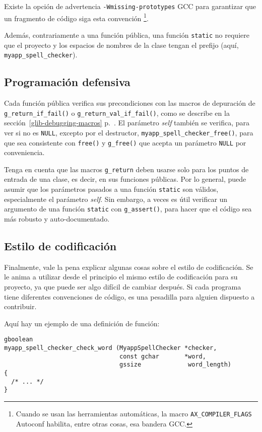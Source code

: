 Existe la opción de advertencia \texttt{-Wmissing-prototypes} GCC para garantizar que un fragmento de código siga esta convención \footnote{Cuando se usan las herramientas automáticas, la macro \texttt{AX\_COMPILER\_FLAGS} Autoconf habilita, entre otras cosas, esa bandera GCC.}.

Además, contrariamente a una función pública, una función \lstinline{static} no requiere que el proyecto y los espacios de nombres de la clase tengan el prefijo (aquí, \lstinline{myapp_spell_checker}).

\subsection{Programación defensiva}
Cada función pública verifica sus precondiciones con las macros de depuración de \lstinline{g_return_if_fail()} o \lstinline{g_return_val_if_fail()}, como se describe en la sección~\ref{glib-debugging-macros} p.~\pageref{glib-debugging-macros}. El parámetro \emph{self} también se verifica, para ver si no es \lstinline{NULL}, excepto por el destructor, \lstinline{myapp_spell_checker_free()}, para que sea consistente con \lstinline{free()} y \lstinline{g_free()} que acepta un parámetro \lstinline{NULL} por conveniencia.

Tenga en cuenta que las macros \lstinline{g_return} deben usarse solo para los puntos de entrada de una clase, es decir, en sus funciones públicas. Por lo general, puede asumir que los parámetros pasados a una función \lstinline{static} son válidos, especialmente el parámetro \emph{self}. Sin embargo, a veces es útil verificar un argumento de una función \lstinline{static} con \lstinline{g_assert()}, para hacer que el código sea más robusto y auto-documentado.

\subsection{Estilo de codificación}
Finalmente, vale la pena explicar algunas cosas sobre el estilo de codificación. Se le anima a utilizar desde el principio el mismo estilo de codificación para su proyecto, ya que puede ser algo difícil de cambiar después. Si cada programa tiene diferentes convenciones de código, es una pesadilla para alguien dispuesto a contribuir.

Aquí hay un ejemplo de una definición de función:

\begin{lstlisting}[style=GLib/GTK]
gboolean
myapp_spell_checker_check_word (MyappSpellChecker *checker,
                                const gchar       *word,
                                gssize             word_length)
{
  /* ... */
}
\end{lstlisting}

